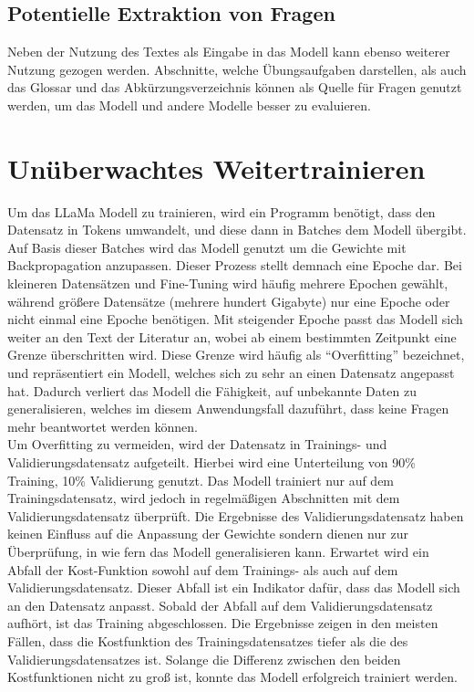 \subsection{Potentielle Extraktion von Fragen}
Neben der Nutzung des Textes als Eingabe in das Modell kann ebenso weiterer Nutzung gezogen werden.
Abschnitte, welche Übungsaufgaben darstellen, als auch das Glossar und das Abkürzungsverzeichnis können als Quelle für Fragen genutzt werden,
um das Modell und andere Modelle besser zu evaluieren.

\section{Unüberwachtes Weitertrainieren}
Um das LLaMa Modell zu trainieren, wird ein Programm benötigt, dass den Datensatz in Tokens umwandelt, und diese dann in Batches dem Modell übergibt.
Auf Basis dieser Batches wird das Modell genutzt um die Gewichte mit Backpropagation anzupassen.
Dieser Prozess stellt demnach eine Epoche dar.
Bei kleineren Datensätzen und Fine-Tuning wird häufig mehrere Epochen gewählt, während größere Datensätze (mehrere hundert Gigabyte) nur eine Epoche oder nicht einmal eine Epoche benötigen.
Mit steigender Epoche passt das Modell sich weiter an den Text der Literatur an, wobei ab einem bestimmten Zeitpunkt eine Grenze überschritten wird.
Diese Grenze wird häufig als \enquote{Overfitting} bezeichnet, und repräsentiert ein Modell, welches sich zu sehr an einen Datensatz angepasst hat.
Dadurch verliert das Modell die Fähigkeit, auf unbekannte Daten zu generalisieren, welches im diesem Anwendungsfall dazuführt, dass keine Fragen mehr beantwortet werden können.\\

Um Overfitting zu vermeiden, wird der Datensatz in Trainings- und Validierungsdatensatz aufgeteilt.
Hierbei wird eine Unterteilung von 90\% Training, 10\% Validierung genutzt.
Das Modell trainiert nur auf dem Trainingsdatensatz, wird jedoch in regelmäßigen Abschnitten mit dem Validierungsdatensatz überprüft.
Die Ergebnisse des Validierungsdatensatz haben keinen Einfluss auf die Anpassung der Gewichte sondern dienen nur zur Überprüfung, in wie fern das Modell generalisieren kann.
Erwartet wird ein Abfall der Kost-Funktion sowohl auf dem Trainings- als auch auf dem Validierungsdatensatz.
Dieser Abfall ist ein Indikator dafür, dass das Modell sich an den Datensatz anpasst.
Sobald der Abfall auf dem Validierungsdatensatz aufhört, ist das Training abgeschlossen.
Die Ergebnisse zeigen in den meisten Fällen, dass die Kostfunktion des Trainingsdatensatzes tiefer als die des Validierungsdatensatzes ist.
Solange die Differenz zwischen den beiden Kostfunktionen nicht zu groß ist, konnte das Modell erfolgreich trainiert werden.\\

